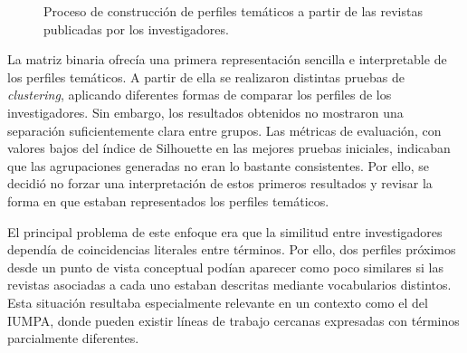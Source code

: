 \documentclass[11pt,spanish,listoffigures,listoftables]{tfgetsinf}
\begin{document}
\begin{figure}[H]
\centering
\small
{}
\caption{Proceso de construcción de perfiles temáticos a partir de las revistas publicadas por los investigadores.}
\label{fig:flujo_representacion_tematica}
\end{figure}

La matriz binaria ofrecía una primera representación sencilla e interpretable de los perfiles temáticos. A partir de ella se realizaron distintas pruebas de \textit{clustering}, aplicando diferentes formas de comparar los perfiles de los investigadores. Sin embargo, los resultados obtenidos no mostraron una separación suficientemente clara entre grupos. Las métricas de evaluación, con valores bajos del índice de Silhouette en las mejores pruebas iniciales, indicaban que las agrupaciones generadas no eran lo bastante consistentes. Por ello, se decidió no forzar una interpretación de estos primeros resultados y revisar la forma en que estaban representados los perfiles temáticos.

El principal problema de este enfoque era que la similitud entre investigadores dependía de coincidencias literales entre términos. Por ello, dos perfiles próximos desde un punto de vista conceptual podían aparecer como poco similares si las revistas asociadas a cada uno estaban descritas mediante vocabularios distintos. Esta situación resultaba especialmente relevante en un contexto como el del IUMPA, donde pueden existir líneas de trabajo cercanas expresadas con términos parcialmente diferentes.
\end{document}
